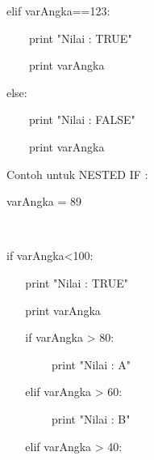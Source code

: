 \vspace{12pt}
\noindent 
elif varAngka==123: \par
\vspace{12pt}
\noindent 
 $  $  $  $  $  $  $  $  $  $  $  $  $  $print "Nilai : TRUE" \par
\vspace{12pt}
\noindent 
 $  $  $  $  $  $  $  $  $  $  $  $  $  $print varAngka \par
\vspace{12pt}
\noindent 
else: \par
\vspace{12pt}
\noindent 
 $  $  $  $  $  $  $  $  $  $  $  $  $  $print "Nilai : FALSE" \par
\vspace{12pt}
\noindent 
 $  $  $  $  $  $  $  $  $  $  $  $  $  $print varAngka \par
\vspace{12pt}
\noindent 
Contoh untuk NESTED IF :  \par
\vspace{12pt}
\noindent 
varAngka = 89 \par
\noindent 
 $  $ \par
\noindent 
if varAngka<100: \par
\vspace{12pt}
\noindent 
 $  $  $  $  $  $  $  $  $  $  $  $print "Nilai : TRUE" \par
\vspace{12pt}
\noindent 
 $  $  $  $  $  $  $  $  $  $  $  $print varAngka \par
\vspace{12pt}
\noindent 
 $  $  $  $  $  $  $  $  $  $  $  $if varAngka > 80: \par
\vspace{12pt}
\noindent 
 $  $  $  $  $  $  $  $  $  $  $  $  $  $  $  $  $  $  $  $  $  $  $  $ print "Nilai : A" \par
\vspace{12pt}
\noindent 
 $  $  $  $  $  $  $  $  $  $  $  $elif varAngka > 60: \par
\vspace{12pt}
\noindent 
 $  $  $  $  $  $  $  $  $  $  $  $  $  $  $  $  $  $  $  $  $  $  $  $ print "Nilai : B" \par
\vspace{12pt}
\noindent 
 $  $  $  $  $  $  $  $  $  $  $  $elif varAngka > 40: \par
\vspace{12pt}
\noindent 
